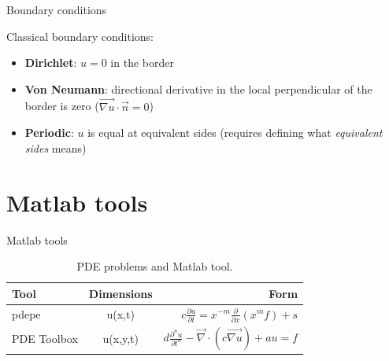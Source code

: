 \documentclass{beamer}
\begin{document}
  \begin{frame}{Boundary conditions}

    Classical boundary conditions:

    \begin{itemize}
    \item \textbf{Dirichlet}: $u = 0$ in the border
    \pause
    \item \textbf{Von Neumann}: directional derivative in the local perpendicular of the border is zero ($\vec{\nabla u} \cdot \vec n = 0$)
    \pause
    \item \textbf{Periodic}: $u$ is equal at equivalent sides (requires defining what \textit{equivalent sides} means)
    \end{itemize}

  \end{frame}

\section{Matlab tools}

  \begin{frame}{Matlab tools}
  
    \begin{table}
    \centering
    \begin{tabular}{l|c|r}
    Tool & Dimensions & Form \\\hline
    pdepe & u(x,t) & $c \frac{\partial u}{\partial t} = x^{-m} \frac{\partial}{\partial x}(x^m f) + s$\\
    PDE Toolbox & u(x,y,t) & $d \frac{\partial^n u}{\partial t^n} - \vec \nabla \cdot (c \vec{\nabla u}) + a u= f$
    \end{tabular}
    \caption{\label{tab:MatlabTools}PDE problems and Matlab tool.}
    \end{table}
  
  \end{frame}
\end{document}
